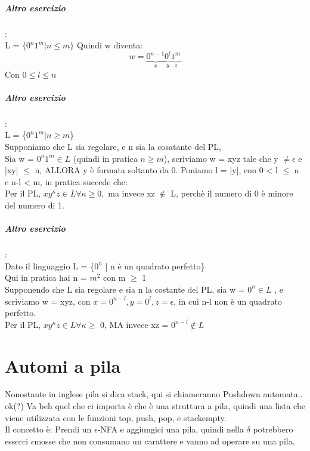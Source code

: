 \documentclass[12pt, a4paper, openany, oneside]{book}
\begin{document}
\paragraph{Altro esercizio}:\\
L = $\{0^{n}1^{m} | n \leq m\}$ Quindi w diventa:
\[
w = \underbrace{0^{n-1}}_{x} \underbrace{0^{l}}_{y} \underbrace{1^{m}}_{z}
\]	
Con $0 \leq l \leq n$
\paragraph{Altro esercizio}:\\
L = \{$0^{n}1^{m} | n \geq m$\}\\
Supponiamo che L sia regolare, e n sia la cosatante del PL, \\
Sia w = $0^{n}1^{m} \in L$ (quindi in pratica $n\geq m$), scriviamo w = xyz tale
che y $\neq \epsilon$ e |xy| $\leq$ n, ALLORA y è formata soltanto da 0.
Poniamo l = |y|, con 0 < l $\leq$ n e n-l < m, in pratica succede che:\\
Per il PL, $xy^{\kappa}z \in L \forall \kappa \geq 0,$ ma invece xz $\notin$ L, 
perchè il numero di 0 è minore del numero di 1.
\paragraph{Altro esercizio}:\\
Dato il linguaggio L = \{$0^{n}$ | n è un quadrato perfetto\}\\
Qui in pratica hai n = $m^{2}$ con m $\geq$ 1\\
Supponendo che L sia regolare e sia n la costante del PL, sia w = $0^{n} \in L$
, e scriviamo w = xyz, con $x = 0^{n-l}, y = 0^{l}, z = \epsilon$, in cui n-l non è 
un quadrato perfetto. \\
Per il PL, $xy^{\kappa}z \in L \forall \kappa \geq$ 0, MA invece xz = $0^{n-l} 
\notin L$
\chapter{Automi a pila}
Nonostante in inglese pila si dica stack, qui si chiameranno Pushdown automata..
ok(?) Va beh quel che ci importa è che è una struttura a pila, quindi una lista 
che viene utilizzata con le funzioni top, push, pop, e stackempty.
\\
Il concetto è: Prendi un $\epsilon$-NFA e aggiungici una pila, quindi nella 
$\delta$ potrebbero esserci $\epsilon$mosse che non consumano un carattere e 
vanno ad operare su una pila. 
\end{document}
